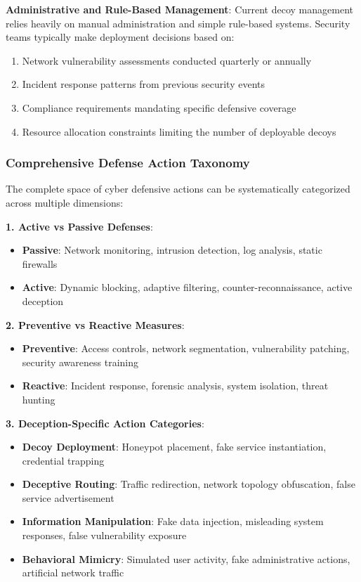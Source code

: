 \documentclass[12pt]{article}
\theoremstyle{definition}
\theoremstyle{plain}
\begin{document}
\textbf{Administrative and Rule-Based Management}: Current decoy management relies heavily on manual administration and simple rule-based systems. Security teams typically make deployment decisions based on:

\begin{enumerate}
\item Network vulnerability assessments conducted quarterly or annually
\item Incident response patterns from previous security events
\item Compliance requirements mandating specific defensive coverage
\item Resource allocation constraints limiting the number of deployable decoys
\end{enumerate}

\subsubsection{Comprehensive Defense Action Taxonomy}

The complete space of cyber defensive actions can be systematically categorized across multiple dimensions:

\textbf{1. Active vs Passive Defenses}:
\begin{itemize}
\item \textbf{Passive}: Network monitoring, intrusion detection, log analysis, static firewalls
\item \textbf{Active}: Dynamic blocking, adaptive filtering, counter-reconnaissance, active deception
\end{itemize}

\textbf{2. Preventive vs Reactive Measures}:
\begin{itemize}
\item \textbf{Preventive}: Access controls, network segmentation, vulnerability patching, security awareness training
\item \textbf{Reactive}: Incident response, forensic analysis, system isolation, threat hunting
\end{itemize}

\textbf{3. Deception-Specific Action Categories}:
\begin{itemize}
\item \textbf{Decoy Deployment}: Honeypot placement, fake service instantiation, credential trapping
\item \textbf{Deceptive Routing}: Traffic redirection, network topology obfuscation, false service advertisement
\item \textbf{Information Manipulation}: Fake data injection, misleading system responses, false vulnerability exposure
\item \textbf{Behavioral Mimicry}: Simulated user activity, fake administrative actions, artificial network traffic
\end{itemize}
\end{document}
